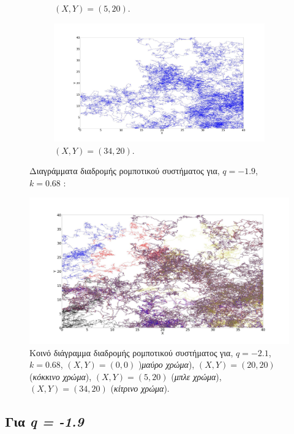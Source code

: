 \begin{figure}[ht]
\begin{subfigure}[b]{0.55\textwidth}
		\caption{$(X,Y) = (5,20)$.}
		\label{f:g86}
	\end{subfigure}
	\hfill
	\begin{subfigure}[b]{0.55\textwidth}
		\centering
		\includegraphics[width=\textwidth]{LateX images/log/XY1/g5-2.1}
		\caption{$(X,Y) = (34,20)$.}
		\label{f:g87}
	\end{subfigure}
	\hfill
	\caption{Διαγράμματα διαδρομής ρομποτικού συστήματος για, $q = -1.9$, $k = 0.68$ :}
\end{figure}

\begin{figure}[ht]
	\centering
	\includegraphics[width=1\linewidth]{LateX images/log/XY1/g2}
	\caption{Κοινό διάγραμμα διαδρομής ρομποτικού συστήματος για, $q = -2.1$, $k = 0.68$, $(X,Y) = (0,0)$ )\emph{μαύρο χρώμα}), $(X,Y) = (20,20)$ (\emph{κόκκινο χρώμα}), $(X,Y) = (5,20)$ (\emph{μπλε χρώμα}), $(X,Y) = (34,20)$ (\emph{κίτρινο χρώμα}).}
	\label{f:g93}	
\end{figure}


\clearpage

\subsection{Για \emph{q = -1.9}}

